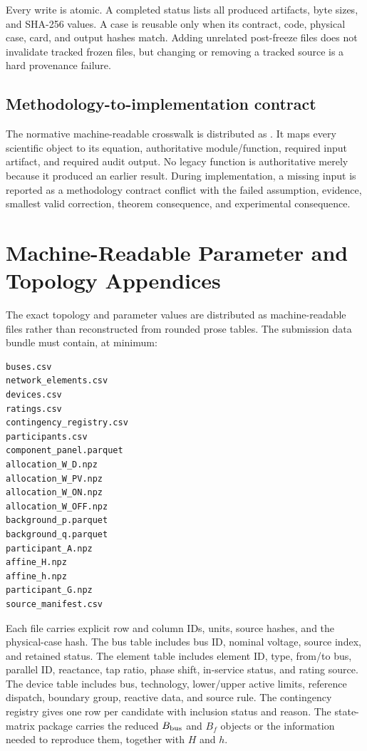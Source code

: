 \documentclass[10pt,journal,onecolumn]{IEEEtran}
\begin{document}
Every write is atomic. A completed status lists all produced artifacts, byte
sizes, and SHA-256 values. A case is reusable only when its contract, code,
physical case, card, and output hashes match. Adding unrelated post-freeze
files does not invalidate tracked frozen files, but changing or removing a
tracked source is a hard provenance failure.

\subsection{Methodology-to-implementation contract}

The normative machine-readable crosswalk is distributed as
. It maps every
scientific object to its equation, authoritative module/function, required
input artifact, and required audit output. No legacy function is authoritative
merely because it produced an earlier result. During implementation, a missing
input is reported as a methodology contract conflict with the failed
assumption, evidence, smallest valid correction, theorem consequence, and
experimental consequence.

\section{Machine-Readable Parameter and Topology Appendices}
\label{sec:report_raw_tables}

The exact topology and parameter values are distributed as machine-readable
files rather than reconstructed from rounded prose tables. The submission data
bundle must contain, at minimum:
\begin{verbatim}
buses.csv
network_elements.csv
devices.csv
ratings.csv
contingency_registry.csv
participants.csv
component_panel.parquet
allocation_W_D.npz
allocation_W_PV.npz
allocation_W_ON.npz
allocation_W_OFF.npz
background_p.parquet
background_q.parquet
participant_A.npz
affine_H.npz
affine_h.npz
participant_G.npz
source_manifest.csv
\end{verbatim}
Each file carries explicit row and column IDs, units, source hashes, and the
physical-case hash. The bus table includes bus ID, nominal voltage, source index,
and retained status. The element table includes element ID, type, from/to bus,
parallel ID, reactance, tap ratio, phase shift, in-service status, and rating
source. The device table includes bus, technology, lower/upper active limits,
reference dispatch, boundary group, reactive data, and source rule. The
contingency registry gives one row per candidate with inclusion status and
reason. The state-matrix package carries the reduced $B_{\rm bus}$ and $B_f$
objects or the information needed to reproduce them, together with $H$ and $h$.
\end{document}

